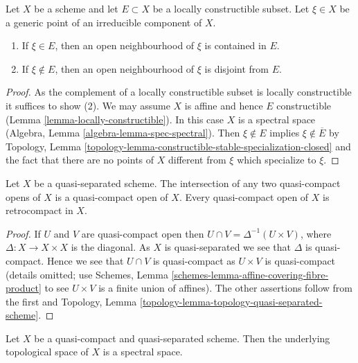 \begin{lemma}
\label{lemma-generic-point-in-constructible}
Let $X$ be a scheme and let $E \subset X$ be a locally constructible subset.
Let $\xi \in X$ be a generic point of an irreducible component of $X$.
\begin{enumerate}
\item If $\xi \in E$, then an open neighbourhood of
$\xi$ is contained in $E$.
\item If $\xi \not \in E$, then an open neighbourhood
of $\xi$ is disjoint from $E$.
\end{enumerate}
\end{lemma}

\begin{proof}
As the complement of a locally constructible subset is locally
constructible it suffices to show (2). We may assume $X$ is
affine and hence $E$ constructible (Lemma \ref{lemma-locally-constructible}).
In this case $X$ is a spectral space
(Algebra, Lemma \ref{algebra-lemma-spec-spectral}).
Then $\xi \not \in E$ implies $\xi \not \in \overline{E}$ by
Topology, Lemma \ref{topology-lemma-constructible-stable-specialization-closed}
and the fact that there are no points of $X$ different from $\xi$
which specialize to $\xi$.
\end{proof}

\begin{lemma}
\label{lemma-quasi-separated-quasi-compact-open-retrocompact}
Let $X$ be a quasi-separated scheme. The intersection of any two
quasi-compact opens of $X$ is a quasi-compact open of $X$.
Every quasi-compact open of $X$ is retrocompact in $X$.
\end{lemma}

\begin{proof}
If $U$ and $V$ are quasi-compact open then
$U \cap V = \Delta^{-1}(U \times V)$, where $\Delta : X \to X \times X$
is the diagonal. As $X$ is quasi-separated we see that $\Delta$ is
quasi-compact. Hence we see that $U \cap V$ is quasi-compact as
$U \times V$ is quasi-compact (details omitted; use
Schemes, Lemma \ref{schemes-lemma-affine-covering-fibre-product}
to see $U \times V$ is a finite union of affines).
The other assertions follow from the first and
Topology, Lemma \ref{topology-lemma-topology-quasi-separated-scheme}.
\end{proof}

\begin{lemma}
\label{lemma-quasi-compact-quasi-separated-spectral}
Let $X$ be a quasi-compact and quasi-separated scheme.
Then the underlying topological space of $X$ is a spectral space.
\end{lemma}

